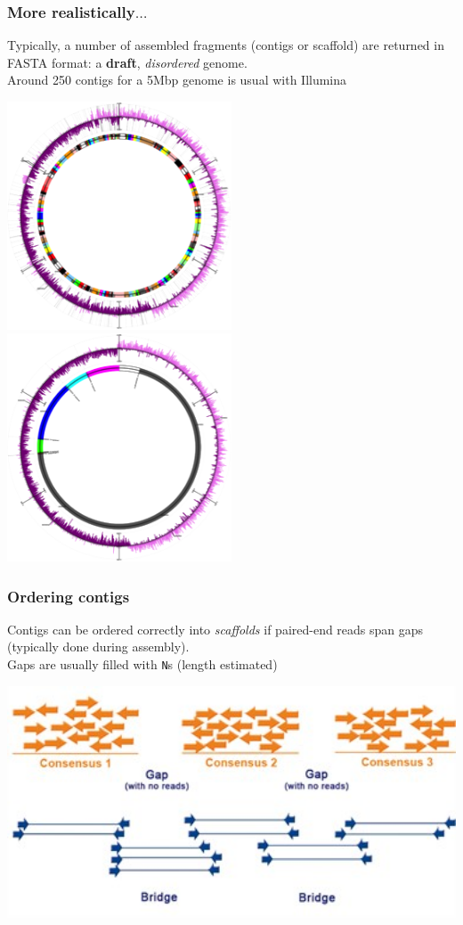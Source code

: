 \begin{frame}
  \frametitle{More realistically$\ldots$}
  Typically, a number of assembled fragments (contigs or scaffold) are returned in FASTA format: a \textbf{draft}, \textit{disordered} genome.\\
  Around 250 contigs for a 5Mbp genome is usual with Illumina\\
  \begin{center}
    \includegraphics[width=0.5\textwidth]{images/circle_1}
    \includegraphics[width=0.5\textwidth]{images/circle_3}
  \end{center}    
\end{frame}

\begin{frame}
  \frametitle{Ordering contigs}
  Contigs can be ordered correctly into \textit{scaffolds} if paired-end reads span gaps (typically done during assembly).\\
  Gaps are usually filled with \texttt{N}s (length estimated)
  \begin{center}
    \includegraphics[width=1\textwidth]{images/contig_order_pe}
  \end{center}    
\end{frame}

